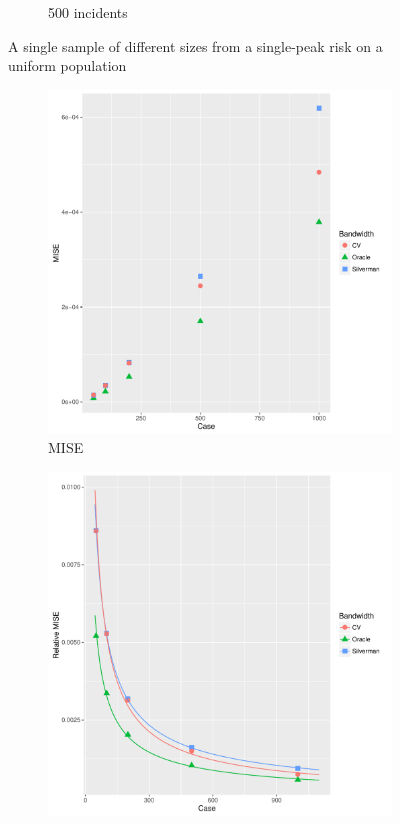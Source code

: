 \begin{figure}[htbp]
\begin{subfigure}{0.45\textwidth}
    \caption{500 incidents}
    \end{subfigure}
    \caption{A single sample of different sizes from a single-peak risk on a uniform population}
    \label{fig:one_sample:unif_NCases_1h}
\end{figure}


\begin{figure}[htbp]
    \centering
    \begin{subfigure}[b]{0.3\textwidth}
    \includegraphics[width=\textwidth]{results/by_num_cases/MISE-vs-cases}
    \caption{MISE}
    \label{fig:ise:unif_NCases_1h:a}
    \end{subfigure}
    \begin{subfigure}[b]{0.3\textwidth}
    \includegraphics[width=\textwidth]{results/by_num_cases/RMISE-vs-cases}

\end{subfigure}
\end{figure}
